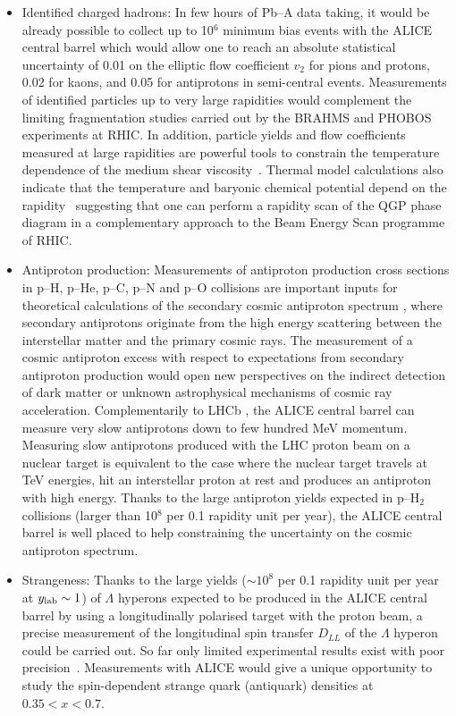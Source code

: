 \documentclass[../report.tex]{subfiles}
\begin{document}
\begin{itemize}
\item{Identified charged hadrons: In few hours of Pb--A data taking, it would be already possible to collect up to 10$^{6}$ minimum bias events with the ALICE central barrel which would allow one to reach an absolute statistical uncertainty of 0.01 on the elliptic flow coefficient $v_{2}$ for pions and protons, 0.02 for kaons, and 0.05 for antiprotons in semi-central events. Measurements of identified particles up to very large rapidities would complement the limiting fragmentation studies carried out by the BRAHMS and PHOBOS experiments at RHIC. 
In addition, particle yields and flow coefficients measured at large rapidities are powerful tools to constrain the temperature dependence of the medium shear viscosity~\cite{Denicol:2015nhu}. Thermal model calculations also indicate that the temperature and baryonic chemical potential depend on the rapidity~\cite{Becattini:2007qr,Karpenko:2018xam,Begun:2018efg} suggesting that one can perform a rapidity scan of the QGP phase diagram in a complementary approach to the Beam Energy Scan programme of RHIC.
} 

\item{Antiproton production: Measurements of antiproton production cross sections in p--H, p--He, p--C, p--N and p--O collisions are important inputs for theoretical calculations of the secondary cosmic antiproton spectrum \cite{Moskalenko:1997gh, Vladimirov:2010aq, Orlando:2017tde}, where secondary antiprotons originate from the high energy scattering between the interstellar matter and the primary cosmic rays. The measurement of a cosmic antiproton excess with respect to expectations from secondary antiproton production would open new perspectives on the indirect detection of dark matter or unknown astrophysical mechanisms of cosmic ray acceleration. Complementarily to LHCb \cite{Aaij:2018svt}, the ALICE central barrel can measure very slow antiprotons down to few hundred MeV momentum. Measuring slow antiprotons produced with the LHC proton beam on a nuclear target is equivalent to the case where the nuclear target travels at TeV energies, hit an interstellar proton at rest and produces an antiproton with high energy. Thanks to the large antiproton yields expected in p--H$_{2}$ collisions (larger than 10$^{8}$ per 0.1 rapidity unit per year), the ALICE central barrel is well placed to help constraining the uncertainty on the cosmic antiproton spectrum.}

\item{Strangeness: Thanks to the large yields ($\sim 10^{8}$ per 0.1 rapidity unit per year at $y_{\rm lab} \sim 1$) of $\Lambda$ hyperons expected to be produced in the ALICE central barrel by using a longitudinally polarised target with the proton beam, a precise measurement of the longitudinal spin transfer $D_{LL}$ of the $\Lambda$ hyperon could be carried out. So far only limited experimental results exist with poor precision~\cite{Abelev:2009xg,Alekseev:2009ab}. Measurements with ALICE would give a unique opportunity to study the spin-dependent strange quark (antiquark) densities at $0.35<x<0.7$.}


\end{itemize}
\end{document}

